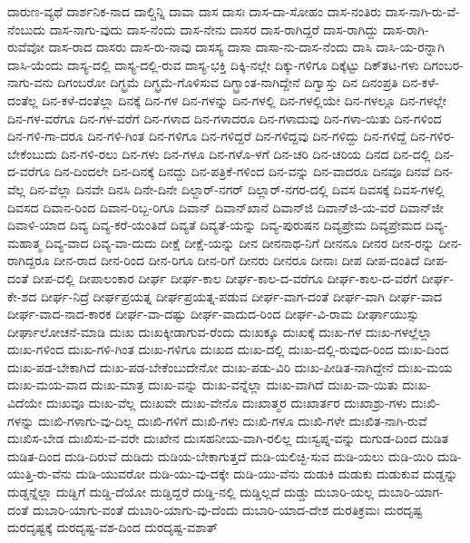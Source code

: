 {ದಾರುಣ-ವ್ಯಥೆ
ದಾರ್ಶನಿಕ-ನಾದ
ದಾಲ್ಚಿನ್ನಿ
ದಾವಾ
ದಾಸ
ದಾಸಃ
ದಾಸ-ದಾ-ಸೋಹಂ
ದಾಸ-ನಂತಿರು
ದಾಸ-ನಾಗಿ-ರು-ವೆ-ನೆಂಬುದು
ದಾಸ-ನಾಗು-ವುದು
ದಾಸ-ನೆಂದು
ದಾಸ-ನೇನು
ದಾಸರ
ದಾಸ-ರಾಗಿದ್ದರೆ
ದಾಸ-ರಾಗಿದ್ದು
ದಾಸ-ರಾಗಿ-ರುವೆವೋ
ದಾಸ-ರಾದ
ದಾಸರು
ದಾಸ-ರು-ನಾವು
ದಾಸಸ್ಯ
ದಾಸಾ
ದಾಸಾ-ನು-ದಾಸ-ನೆಂದು
ದಾಸಿ
ದಾಸಿ-ಯ-ರನ್ನಾಗಿ
ದಾಸಿ-ಯೆಂದು
ದಾಸ್ಯ-ದಲ್ಲಿ
ದಾಸ್ಯ-ದಲ್ಲಿ-ರುವ
ದಾಸ್ಯ-ಭಕ್ತಿ
ದಿಕ್ಕಿ-ನಲ್ಲೇ
ದಿಕ್ಕು-ಗಳಿಗೂ
ದಿಕ್ಕೆಟ್ಟು
ದಿಕ್‌ತಟ-ಗಳು
ದಿಗಂಬರ-ನಾಗು-ವನು
ದಿಗಂಬರೋ
ದಿಗ್ಭ್ರಮೆ
ದಿಗ್ಭ್ರಮೆ-ಗೊಳಿಸುವ
ದಿಗ್ಭ್ರಾಂತ-ನಾಗಿದ್ದೇನೆ
ದಿಗ್ವಾಸ್ತು
ದಿನ
ದಿನಂಪ್ರತಿ
ದಿನ-ಕಳೆ-ದಂತೆಲ್ಲ
ದಿನ-ಕಳೆ-ದಂತೆಲ್ಲಾ
ದಿನಕ್ಕೆ
ದಿನ-ಗಳ
ದಿನ-ಗಳನ್ನು
ದಿನ-ಗಳಲ್ಲಿ
ದಿನ-ಗಳಲ್ಲಿಯೇ
ದಿನ-ಗಳಲ್ಲೂ
ದಿನ-ಗಳಲ್ಲೇ
ದಿನ-ಗಳ-ವರೆಗೂ
ದಿನ-ಗಳ-ವರೆಗೆ
ದಿನ-ಗಳಾದ
ದಿನ-ಗಳಾದರೂ
ದಿನ-ಗಳಾದುವು
ದಿನ-ಗಳಾ-ಯಿತು
ದಿನ-ಗಳಿಂದ
ದಿನ-ಗಳಿ-ಗಾ-ದರೂ
ದಿನ-ಗಳಿ-ಗಿಂತ
ದಿನ-ಗಳಿಗೂ
ದಿನ-ಗಳಿದ್ದರೆ
ದಿನ-ಗಳಿದ್ದವು
ದಿನ-ಗಳಿದ್ದು
ದಿನ-ಗಳಿದ್ದೆ
ದಿನ-ಗಳಿರ-ಬೇಕೆಂಬುದು
ದಿನ-ಗಳಿ-ರಲು
ದಿನ-ಗಳು
ದಿನ-ಗಳೂ
ದಿನ-ಗಳೊ-ಳಗೆ
ದಿನ-ಚರಿ
ದಿನ-ಚರಿಯ
ದಿನದ
ದಿನ-ದಲ್ಲಿ
ದಿನ-ದ-ವರೆಗೂ
ದಿನ-ದಿಂದಲೇ
ದಿನ-ದಿನಕ್ಕೆ
ದಿನದ್ದು
ದಿನ-ಪತ್ರಿಕೆ-ಗಳಿಂದ
ದಿನ-ವನ್ನು
ದಿನ-ವಾದರೂ
ದಿನವೂ
ದಿನವೆ
ದಿನ-ವೆಲ್ಲ
ದಿನ-ವೆಲ್ಲಾ
ದಿನವೇ
ದಿನಸಿ
ದಿನೇ-ದಿನೇ
ದಿಲ್ದಾರ್‌-ನಗರ್
ದಿಲ್ಲಾರ್‌-ನಗರ-ದಲ್ಲಿ
ದಿವಸ
ದಿವಸಕ್ಕೆ
ದಿವಸ-ಗಳಲ್ಲಿ
ದಿವಸದ
ದಿವಾನ-ರಿಂದ
ದಿವಾನ-ರಿಬ್ಬ-ರಿಗೂ
ದಿವಾನ್
ದಿವಾನ್‌ಖಾನೆ
ದಿವಾನ್‌ಜಿ
ದಿವಾನ್‌ಜಿ-ಯ-ವರೆ
ದಿವಾನ್‌ಜೀ
ದಿವಾಳಿ-ಯಾದ
ದಿವ್ಯ
ದಿವ್ಯ-ಕರೆ-ಯಂತಿದೆ
ದಿವ್ಯತೆ
ದಿವ್ಯತೆ-ಯನ್ನು
ದಿವ್ಯ-ಪುರುಷನ
ದಿವ್ಯಪ್ರೇಮ
ದಿವ್ಯಪ್ರೇಮದ
ದಿವ್ಯ-ಮಹಾತ್ಮ
ದಿವ್ಯ-ವಾದ
ದಿವ್ಯ-ವಾ-ದುದು
ದೀಕ್ಷೆ
ದೀಕ್ಷೆ-ಯನ್ನು
ದೀನ
ದೀನನಾಥ-ನಿಗೆ
ದೀನನೂ
ದೀನರ
ದೀನ-ರನ್ನು
ದೀನ-ರಾಗಿದ್ದರೂ
ದೀನ-ರಾದ
ದೀನ-ರಿಂದ
ದೀನ-ರಿಗೂ
ದೀನ-ರಿಗೆ
ದೀನರು
ದೀನರೂ
ದೀನಾಃ
ದೀಪ
ದೀಪ-ದಂತಿದೆ
ದೀಪ-ದಂತೆ
ದೀಪ-ದಲ್ಲಿ
ದೀಪಾಲಂಕಾರ
ದೀರ್ಘ
ದೀರ್ಘ-ಕಾಲ
ದೀರ್ಘ-ಕಾಲ-ದ-ವರೆಗೂ
ದೀರ್ಘ-ಕಾಲ-ದ-ವರೆಗೆ
ದೀರ್ಘ-ಕೇ-ಶದ
ದೀರ್ಘ-ನಿದ್ರೆ
ದೀರ್ಘಪ್ರಯತ್ನ
ದೀರ್ಘಪ್ರಯತ್ನ-ಪಡುವ
ದೀರ್ಘ-ವಾಗ-ದಂತೆ
ದೀರ್ಘ-ವಾಗಿ
ದೀರ್ಘ-ವಾದ
ದೀರ್ಘ-ವಾದ-ನಾದ-ಕಾರಕ
ದೀರ್ಘ-ವಾ-ದಷ್ಟು
ದೀರ್ಘ-ವಾದುದ-ರಿಂದ
ದೀರ್ಘ-ವಿ-ರಾಮ
ದೀರ್ಘಾಯುಸ್ಸು
ದೀರ್ಘಾಲೋಚನೆ-ಮಾಡಿ
ದುಃಖ
ದುಃಖಕ್ಕೀಡಾಗುವ-ರೆಂದು
ದುಃಖಕ್ಕೂ
ದುಃಖಕ್ಕೆ
ದುಃಖ-ಗಳ
ದುಃಖ-ಗಳಲ್ಲೆಲ್ಲಾ
ದುಃಖ-ಗಳಿಂದ
ದುಃಖ-ಗಳಿ-ಗಿಂತ
ದುಃಖ-ಗಳಿಗೂ
ದುಃಖದ
ದುಃಖ-ದಲ್ಲಿ
ದುಃಖ-ದಲ್ಲಿ-ರುವುದ-ರಿಂದ
ದುಃಖ-ದಿಂದ
ದುಃಖ-ಪಡ-ಬೇಕಾಗಿದೆ
ದುಃಖ-ಪಡ-ಬೇಕೆಂಬುದೇನೋ
ದುಃಖ-ಪಡು-ವಿರಿ
ದುಃಖ-ಪೀಡಿತ-ನಾಗಿದ್ದೇನೆ
ದುಃಖ-ಮಯ
ದುಃಖ-ಮಯ-ವಾದ
ದುಃಖ-ಮಾತ್ರ
ದುಃಖ-ವನ್ನು
ದುಃಖ-ವನ್ನೆಲ್ಲಾ
ದುಃಖ-ವಾಗಿದೆ
ದುಃಖ-ವಾ-ಯಿತು
ದುಃಖ-ವಿದೆಯೇ
ದುಃಖವೂ
ದುಃಖ-ವೆಲ್ಲ
ದುಃಖವೇ
ದುಃಖ-ವೇನೊ
ದುಃಖಾತ್ಮರ
ದುಃಖಾರ್ತರ
ದುಃಖಾಶ್ರು-ಗಳು
ದುಃಖಿ-ಗಳನ್ನು
ದುಃಖಿ-ಗಳಾಗು-ವು-ದಿಲ್ಲ
ದುಃಖಿ-ಗಳಿಗೆ
ದುಃಖಿ-ಗಳು
ದುಃಖಿ-ಗಳೂ
ದುಃಖಿ-ಗಳೇ
ದುಃಖಿತ-ನಾಗಿ-ರುವೆ
ದುಃಖಿಸ-ಬೇಡ
ದುಃಖಿಸು-ವ-ವರೇ
ದುಃಖೇನ
ದುಃಸಹನೀಯ-ವಾಗಿ-ರಲಿಲ್ಲ
ದುಃಸ್ವಪ್ನ-ವನ್ನು
ದುಗುಡ-ದಿಂದ
ದುಡಿತ
ದುಡಿತ-ದಿಂದ
ದುಡಿ-ದಿರುವೆ
ದುಡಿದು
ದುಡಿಯ-ಬೇಕಾಗುತ್ತದೆ
ದುಡಿ-ಯಲಿಚ್ಛಿ-ಸುವ
ದುಡಿ-ಯಲು
ದುಡಿ-ಯಿರಿ
ದುಡಿ-ಯುತ್ತಿ-ರು-ವೆನು
ದುಡಿ-ಯುವರೋ
ದುಡಿ-ಯು-ವು-ದಕ್ಕೇ
ದುಡಿ-ಯು-ವೆನು
ದುಡುಕಿ
ದುಡುಕು
ದುಡುಕುವ
ದುಡ್ಡನ್ನು
ದುಡ್ಡನ್ನೆಲ್ಲಾ
ದುಡ್ಡಿಗೆ
ದುಡ್ಡಿ-ದೆಯೋ
ದುಡ್ಡಿದ್ದರೆ
ದುಡ್ಡಿ-ನಲ್ಲಿ
ದುಡ್ಡಿಲ್ಲದೆ
ದುಡ್ಡು
ದುಬಾರಿ-ಯಲ್ಲ
ದುಬಾರಿ-ಯಾಗ-ದಂತೆ
ದುಬಾರಿ-ಯಾಗು-ವಂತೆ
ದುಬಾರಿ-ಯಾಗು-ವು-ದೆಂದು
ದುಬಾರಿ-ಯಾದ-ದೇಶ
ದುರತಿಕ್ರಮಃ
ದುರದೃಷ್ಟ
ದುರದೃಷ್ಟಕ್ಕೆ
ದುರದೃಷ್ಟ-ವಶ-ದಿಂದ
ದುರದೃಷ್ಟ-ವಶಾತ್
}
